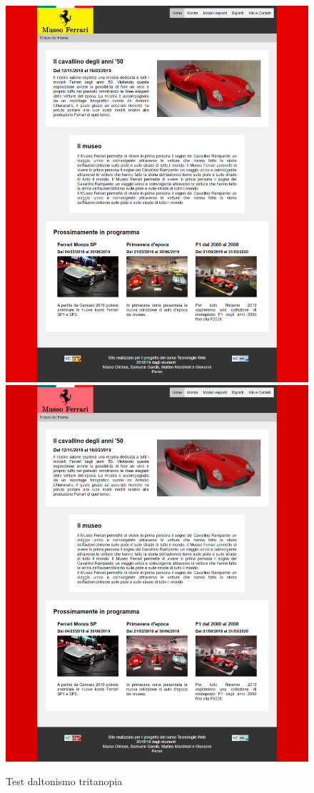 \begin{figure}[h!]
	\begin{center}
		\includegraphics[scale=0.15]{Images/original.png}
		\includegraphics[scale=0.15]{Images/tritanopia.png}
		\caption{Test daltonismo tritanopia}
	\end{center}
\end{figure}

